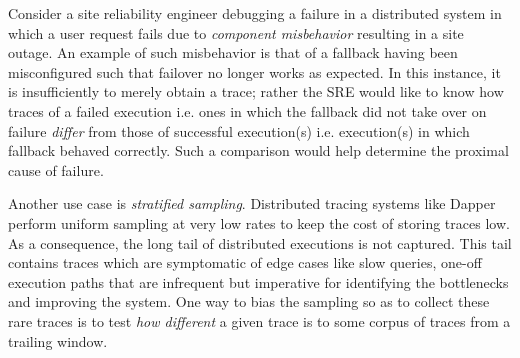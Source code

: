 Consider a site reliability engineer debugging a failure in a distributed system in which a user request fails due to \emph{component misbehavior} resulting in a site outage. An example of such misbehavior is that of a fallback having been misconfigured such that failover no longer works as expected. In this instance, it is insufficiently to merely obtain a trace; rather the SRE would like to know how traces of a failed execution i.e. ones in which the fallback did not take over on failure \emph{differ} from those of successful execution(s) i.e. execution(s) in which fallback behaved correctly. Such a comparison would help determine the proximal cause of failure. 

Another use case is \emph{stratified sampling}. Distributed tracing systems like Dapper~\cite{36356} perform uniform sampling at very low rates to keep the cost of storing traces low.  As a consequence, the long tail of distributed executions is not captured. This tail contains traces which are symptomatic of edge cases like slow queries, one-off execution paths that are infrequent but imperative for identifying the bottlenecks and improving the system. One way to bias the sampling so as to collect these rare traces is to test \emph{how different} a given trace is to some corpus of traces from a trailing window.



